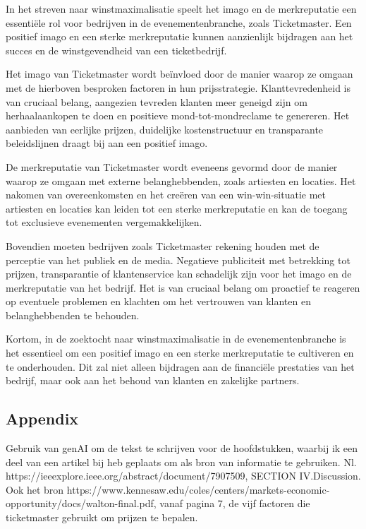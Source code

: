 In het streven naar winstmaximalisatie speelt het imago en de merkreputatie een essentiële rol voor bedrijven in de evenementenbranche, zoals Ticketmaster. Een positief imago en een sterke merkreputatie kunnen aanzienlijk bijdragen aan het succes en de winstgevendheid van een ticketbedrijf.

Het imago van Ticketmaster wordt beïnvloed door de manier waarop ze omgaan met de hierboven besproken factoren in hun prijsstrategie. Klanttevredenheid is van cruciaal belang, aangezien tevreden klanten meer geneigd zijn om herhaalaankopen te doen en positieve mond-tot-mondreclame te genereren. Het aanbieden van eerlijke prijzen, duidelijke kostenstructuur en transparante beleidslijnen draagt bij aan een positief imago.

De merkreputatie van Ticketmaster wordt eveneens gevormd door de manier waarop ze omgaan met externe belanghebbenden, zoals artiesten en locaties. Het nakomen van overeenkomsten en het creëren van een win-win-situatie met artiesten en locaties kan leiden tot een sterke merkreputatie en kan de toegang tot exclusieve evenementen vergemakkelijken.

Bovendien moeten bedrijven zoals Ticketmaster rekening houden met de perceptie van het publiek en de media. Negatieve publiciteit met betrekking tot prijzen, transparantie of klantenservice kan schadelijk zijn voor het imago en de merkreputatie van het bedrijf. Het is van cruciaal belang om proactief te reageren op eventuele problemen en klachten om het vertrouwen van klanten en belanghebbenden te behouden.

Kortom, in de zoektocht naar winstmaximalisatie in de evenementenbranche is het essentieel om een positief imago en een sterke merkreputatie te cultiveren en te onderhouden. Dit zal niet alleen bijdragen aan de financiële prestaties van het bedrijf, maar ook aan het behoud van klanten en zakelijke partners.

\subsection{Appendix}
Gebruik van genAI om de tekst te schrijven voor de hoofdstukken, waarbij ik een deel van een artikel bij heb geplaats om als bron van informatie te gebruiken. Nl. https://ieeexplore.ieee.org/abstract/document/7907509, SECTION IV.Discussion.
Ook het bron https://www.kennesaw.edu/coles/centers/markets-economic-opportunity/docs/walton-final.pdf, vanaf pagina 7, de vijf factoren die ticketmaster gebruikt om prijzen te bepalen.
